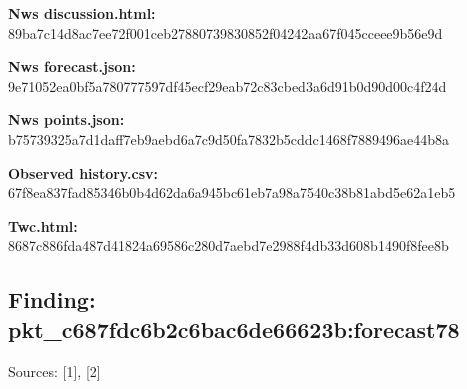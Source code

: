 \documentclass[11pt]{article}
\begin{document}
\par\noindent\textbf{Nws discussion.html:} 89ba7c14d8ac\hspace{0pt}7ee72f001ceb\hspace{0pt}278807398308\hspace{0pt}52f04242aa67\hspace{0pt}f045cceee9b5\hspace{0pt}6e9d

\par\noindent\textbf{Nws forecast.json:} 9e71052ea0bf\hspace{0pt}5a780777597d\hspace{0pt}f45ecf29eab7\hspace{0pt}2c83cbed3a6d\hspace{0pt}91b0d90d00c4\hspace{0pt}f24d

\par\noindent\textbf{Nws points.json:} b75739325a7d\hspace{0pt}1daff7eb9aeb\hspace{0pt}d6a7c9d50fa7\hspace{0pt}832b5cddc146\hspace{0pt}8f7889496ae4\hspace{0pt}4b8a

\par\noindent\textbf{Observed history.csv:} 67f8ea837fad\hspace{0pt}85346b0b4d62\hspace{0pt}da6a945bc61e\hspace{0pt}b7a98a7540c3\hspace{0pt}8b81abd5e62a\hspace{0pt}1eb5

\par\noindent\textbf{Twc.html:} 8687c886fda4\hspace{0pt}87d41824a695\hspace{0pt}86c280d7aebd\hspace{0pt}7e2988f4db33\hspace{0pt}d608b1490f8f\hspace{0pt}ee8b

\subsection*{\textcolor{epdarkgreen}{Finding: pkt\_c687fdc6\hspace{0pt}b2c6bac6de66\hspace{0pt}623b:forecas\hspace{0pt}t78}}
Sources: [1], [2]
\end{document}
